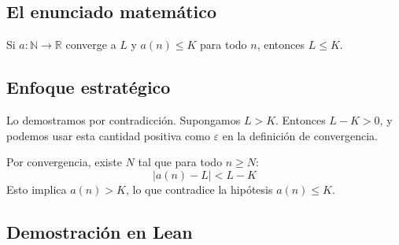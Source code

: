 \subsection{El enunciado matemático}

\begin{theorem}[OrderLimLe]
  Si $a:\mathbb{N}\to\mathbb{R}$ converge a $L$ y $a(n)\leq K$ para todo $n$,
  entonces $L\leq K$.
\end{theorem}

\subsection{Enfoque estratégico}

Lo demostramos por contradicción. Supongamos $L > K$. Entonces $L-K>0$, y
podemos usar esta cantidad positiva como $\varepsilon$ en la definición de
convergencia.

Por convergencia, existe $N$ tal que para todo $n\geq N$:
\[
  |a(n)-L| < L-K
\]
Esto implica $a(n) > K$, lo que contradice la hipótesis $a(n)\leq K$.

\subsection{Demostración en Lean}

